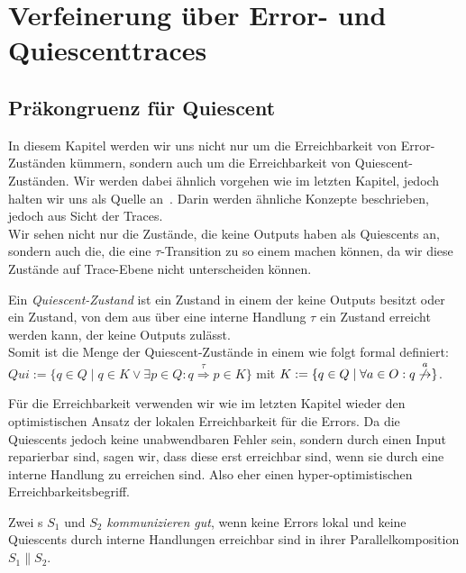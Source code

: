 \chapter{Verfeinerung über Error- und Quiescenttraces}

\section{Präkongruenz für Quiescent}

In diesem Kapitel werden wir uns nicht nur um die Erreichbarkeit von
Error-Zuständen kümmern, sondern auch um die Erreichbarkeit von
Quiescent-Zuständen. Wir werden dabei ähnlich vorgehen wie im letzten Kapitel,
jedoch halten wir uns als Quelle an~\cite{Chilton2013}. Darin werden ähnliche Konzepte
beschrieben, jedoch aus Sicht der Traces.\\
Wir sehen nicht nur die Zustände, die keine Outputs haben als Quiescents an,
sondern auch die, die eine $\tau$-Transition zu so einem machen können, da wir
diese Zustände auf Trace-Ebene nicht unterscheiden können.

\begin{Def}[Quiescent]
  Ein \emph{Quiescent-Zustand} ist ein Zustand in einem \EIO{} der keine Outputs besitzt
  oder ein Zustand, von dem aus über eine interne Handlung $\tau$ ein Zustand
  erreicht werden kann, der keine Outputs zulässt.\\
  Somit ist die Menge der Quiescent-Zustände in einem \EIO{} wie folgt formal
  definiert: $Qui:=\{q\in Q\mid q\in K\vee \exists p\in Q:
  q\overset{\tau}{\Rightarrow} p\in K\}$ mit $K:=\{q\in Q\mid \forall a\in O:
  q\overset{a}{\not{\hspace{-0.1cm}\rightarrow}}\}$.
\end{Def}

Für die Erreichbarkeit verwenden wir wie im letzten Kapitel wieder den
optimistischen Ansatz der lokalen Erreichbarkeit für die Errors. Da die
Quiescents jedoch keine unabwendbaren Fehler sein, sondern durch einen Input
reparierbar sind, sagen wir, dass diese erst erreichbar sind, wenn sie durch
eine interne Handlung zu erreichen sind. Also eher einen hyper-optimistischen
Erreichbarkeitsbegriff.

\begin{Def}
  Zwei \EIO{}s $S_1$ und $S_2$ \emph{kommunizieren gut}, wenn keine Errors
  lokal und keine Quiescents durch interne Handlungen
  erreichbar sind in ihrer Parallelkomposition $S_1\| S_2$.
\end{Def}

